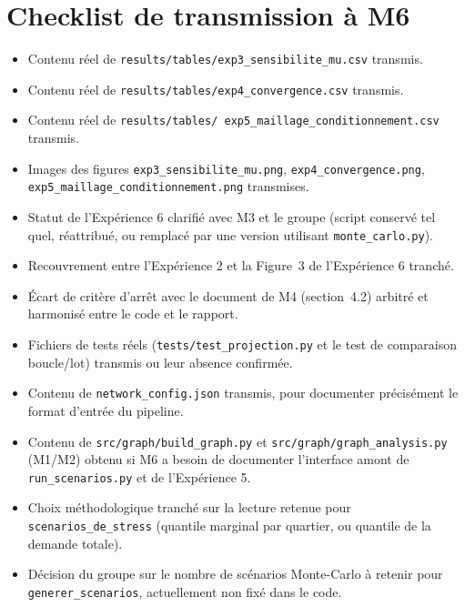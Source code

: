 \documentclass[11pt,a4paper]{article}
\begin{document}
\section{Checklist de transmission à M6}

\begin{itemize}[label=$\square$]
  \item Contenu réel de \texttt{results/tables/exp3\_sensibilite\_mu.csv}
  transmis.
  \item Contenu réel de \texttt{results/tables/exp4\_convergence.csv}
  transmis.
  \item Contenu réel de \texttt{results/tables/
  exp5\_maillage\_conditionnement.csv} transmis.
  \item Images des figures \texttt{exp3\_sensibilite\_mu.png},
  \texttt{exp4\_convergence.png}, \texttt{exp5\_maillage\_conditionnement.png}
  transmises.
  \item Statut de l'Expérience 6 clarifié avec M3 et le groupe (script
  conservé tel quel, réattribué, ou remplacé par une version utilisant
  \texttt{monte\_carlo.py}).
  \item Recouvrement entre l'Expérience 2 et la Figure~3 de l'Expérience 6
  tranché.
  \item Écart de critère d'arrêt avec le document de M4 (section~4.2)
  arbitré et harmonisé entre le code et le rapport.
  \item Fichiers de tests réels (\texttt{tests/test\_projection.py} et le
  test de comparaison boucle/lot) transmis ou leur absence confirmée.
  \item Contenu de \texttt{network\_config.json} transmis, pour documenter
  précisément le format d'entrée du pipeline.
  \item Contenu de \texttt{src/graph/build\_graph.py} et
  \texttt{src/graph/graph\_analysis.py} (M1/M2) obtenu si M6 a besoin de
  documenter l'interface amont de \texttt{run\_scenarios.py} et de
  l'Expérience 5.
  \item Choix méthodologique tranché sur la lecture retenue pour
  \texttt{scenarios\_de\_stress} (quantile marginal par quartier, ou
  quantile de la demande totale).
  \item Décision du groupe sur le nombre de scénarios Monte-Carlo à retenir
  pour \texttt{generer\_scenarios}, actuellement non fixé dans le code.
\end{itemize}
\end{document}
